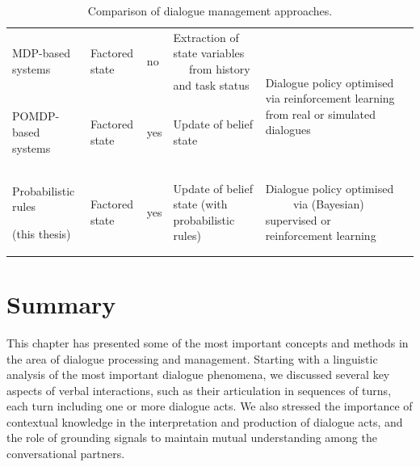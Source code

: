 \begin{table}
\begin{center}
\begin{tabular}{|p{55mm}||p{29mm}|p{16mm}|p{50mm}|p{52mm}|}
MDP-based systems  \; \; \; \; \; \; \; \; \begin{footnotesize}\citep[e.g.][]{Walker:2000,817450}\end{footnotesize} & Factored state & no & Extraction of state variables $\phantom{aa}$ from history and task status &  \multirow{2}{50mm}{$\phantom{aaaaajjjjjaaaaaaaaa}$ Dialogue policy optimised via reinforcement learning from real or simulated dialogues} \vspace{5pt} \\ \cline{1-4}
POMDP-based systems \; \; \; \; \; \; \begin{footnotesize}\citep[e.g.][]{Roy:2000,Young:2010}\end{footnotesize}\vspace{5pt} & Factored state & yes & Update of belief state & \vspace{5pt} \\ \hline
Probabilistic rules \; \; \; \; \; \; \; \; \; \; \begin{footnotesize} (this thesis)\end{footnotesize} & Factored state & yes & Update of belief state \; \; \; \; \; \; (with probabilistic rules) & Dialogue policy optimised $\phantom{aaaa}$ via (Bayesian) supervised or $\phantom{aa}$ reinforcement learning \vspace{5pt} \\ \hline 
\end{tabular}
\end{center}
\caption{Comparison of dialogue management approaches.}
\label{table:approaches}
\end{table}


\section{Summary}

This chapter has presented some of the most important concepts and methods in the area of dialogue processing and management.  Starting with a linguistic analysis of the most important dialogue phenomena, we discussed several key aspects of verbal interactions, such as their articulation in sequences of turns, each turn including one or more dialogue acts. We also stressed the importance of contextual knowledge in the interpretation and production of dialogue acts, and the role of grounding signals to maintain mutual understanding among the conversational partners. 


